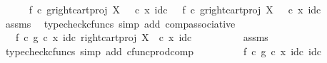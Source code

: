 \begin{isabellebody}
%
\isadelimproof
%
\endisadelimproof
%
\isatagproof
{}\isamarkupfalse%
{\isacharminus}{\kern0pt}\isanewline
\ \ \ \ \isamarkupfalse%
\ {\isachardoublequoteopen}{\isacharparenleft}{\kern0pt}f\isactrlsup {\isasymflat}\ {\isasymcirc}\isactrlsub c\ {\isasymlangle}g\isactrlsup {\isasymflat}{\isacharcomma}{\kern0pt}right{\isacharunderscore}{\kern0pt}cart{\isacharunderscore}{\kern0pt}proj\ X\ {\isasymone}{\isasymrangle}{\isacharparenright}{\kern0pt}\ \ {\isasymcirc}\isactrlsub c\ {\isasymlangle}x{\isacharcomma}{\kern0pt}\ id\isactrlsub c\ {\isasymone}{\isasymrangle}{\isacharequal}{\kern0pt}\ \ f\isactrlsup {\isasymflat}\ {\isasymcirc}\isactrlsub c\ {\isasymlangle}g\isactrlsup {\isasymflat}{\isacharcomma}{\kern0pt}right{\isacharunderscore}{\kern0pt}cart{\isacharunderscore}{\kern0pt}proj\ X\ {\isasymone}{\isasymrangle}\ \ {\isasymcirc}\isactrlsub c\ {\isasymlangle}x{\isacharcomma}{\kern0pt}\ id\isactrlsub c\ {\isasymone}{\isasymrangle}{\isachardoublequoteclose}\isanewline
\ \ \ \ \ \ \isamarkupfalse%
\ assms\ \isamarkupfalse%
\ {\isacharparenleft}{\kern0pt}typecheck{\isacharunderscore}{\kern0pt}cfuncs{\isacharcomma}{\kern0pt}\ simp\ add{\isacharcolon}{\kern0pt}\ comp{\isacharunderscore}{\kern0pt}associative{}{\isacharparenright}{\kern0pt}\isanewline
\ \ \ \ \isamarkupfalse%
\ \isamarkupfalse%
\ {\isachardoublequoteopen}{\isachardot}{\kern0pt}{\isachardot}{\kern0pt}{\isachardot}{\kern0pt}\ {\isacharequal}{\kern0pt}\ f\isactrlsup {\isasymflat}\ {\isasymcirc}\isactrlsub c\ {\isasymlangle}g\isactrlsup {\isasymflat}\ {\isasymcirc}\isactrlsub c\ {\isasymlangle}x{\isacharcomma}{\kern0pt}\ id\isactrlsub c\ {\isasymone}{\isasymrangle}{\isacharcomma}{\kern0pt}right{\isacharunderscore}{\kern0pt}cart{\isacharunderscore}{\kern0pt}proj\ X\ {\isasymone}\ {\isasymcirc}\isactrlsub c\ {\isasymlangle}x{\isacharcomma}{\kern0pt}\ id\isactrlsub c\ {\isasymone}{\isasymrangle}\ {\isasymrangle}{\isachardoublequoteclose}\isanewline
\ \ \ \ \ \ \isamarkupfalse%
\ assms\ \isamarkupfalse%
\ {\isacharparenleft}{\kern0pt}typecheck{\isacharunderscore}{\kern0pt}cfuncs{\isacharcomma}{\kern0pt}\ simp\ add{\isacharcolon}{\kern0pt}\ cfunc{\isacharunderscore}{\kern0pt}prod{\isacharunderscore}{\kern0pt}comp{\isacharparenright}{\kern0pt}\isanewline
\ \ \ \ \isamarkupfalse%
\ \isamarkupfalse%
\ {\isachardoublequoteopen}{\isachardot}{\kern0pt}{\isachardot}{\kern0pt}{\isachardot}{\kern0pt}\ {\isacharequal}{\kern0pt}\ f\isactrlsup {\isasymflat}\ {\isasymcirc}\isactrlsub c\ {\isasymlangle}g\isactrlsup {\isasymflat}\ {\isasymcirc}\isactrlsub c\ {\isasymlangle}x{\isacharcomma}{\kern0pt}\ id\isactrlsub c\ {\isasymone}{\isasymrangle}{\isacharcomma}{\kern0pt}id\isactrlsub c\ {\isasymone}{\isasymrangle}{\isachardoublequoteclose}\isanewline

\end{isabellebody}
